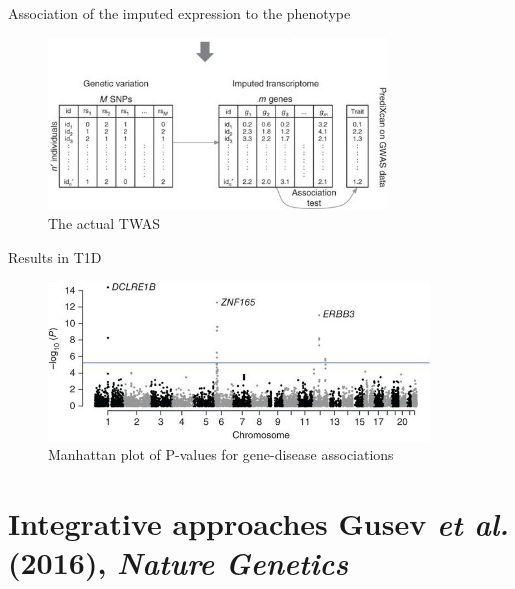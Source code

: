 \documentclass[aspectratio=169,12pt]{beamer}
\newcommand{\etal}{\textit{et al.}\xspace}
\begin{document}
\begin{frame}{Association of the imputed expression to the phenotype}
	
	\begin{figure}
		\includegraphics[width=0.8\textwidth]{gamazon2015/2-grex_estimation_part2}
		\caption{The actual TWAS}
	\end{figure}


\end{frame}

\begin{frame}{Results in T1D}

	\begin{figure}
		\includegraphics[width=0.9\textwidth]{gamazon2015/7-t1d_associations_manhattan}
		\caption{Manhattan plot of P-values for gene-disease 
associations}
	\end{figure}


\end{frame}

\section{Integrative approaches \newline
\scriptsize Gusev \etal (2016), \textit{Nature Genetics}}
\end{document}
